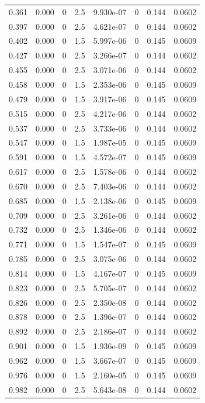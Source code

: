 \documentclass[preview]{standalone}
\begin{document}
{{\begin{tabular}{L{1.2cm}C{1.2cm} C{0.3cm}C{0.5cm} C{1.4cm}C{1.4cm} C{1.4cm}C{1.4cm}}
  0.361  &  0.000  & 0     & 2.5 &  9.930e-07  & 0  & 0.144 &  0.0602   \\ 
  0.397  &  0.000  & 0     & 2.5 &  4.621e-07  & 0  & 0.144 &  0.0602   \\ 
  0.402  &  0.000  & 0     & 1.5 &  5.997e-06  & 0  & 0.145 &  0.0609   \\ 
  0.427  &  0.000  & 0     & 2.5 &  3.266e-07  & 0  & 0.144 &  0.0602   \\ 
  0.455  &  0.000  & 0     & 2.5 &  3.071e-06  & 0  & 0.144 &  0.0602   \\ 
  0.458  &  0.000  & 0     & 1.5 &  2.353e-06  & 0  & 0.145 &  0.0609   \\ 
  0.479  &  0.000  & 0     & 1.5 &  3.917e-06  & 0  & 0.145 &  0.0609   \\ 
  0.515  &  0.000  & 0     & 2.5 &  4.217e-06  & 0  & 0.144 &  0.0602   \\ 
  0.537  &  0.000  & 0     & 2.5 &  3.733e-06  & 0  & 0.144 &  0.0602   \\ 
  0.547  &  0.000  & 0     & 1.5 &  1.987e-05  & 0  & 0.145 &  0.0609   \\ 
  0.591  &  0.000  & 0     & 1.5 &  4.572e-07  & 0  & 0.145 &  0.0609   \\ 
  0.617  &  0.000  & 0     & 2.5 &  1.578e-06  & 0  & 0.144 &  0.0602   \\ 
  0.670  &  0.000  & 0     & 2.5 &  7.403e-06  & 0  & 0.144 &  0.0602   \\ 
  0.685  &  0.000  & 0     & 1.5 &  2.138e-06  & 0  & 0.145 &  0.0609   \\ 
  0.709  &  0.000  & 0     & 2.5 &  3.261e-06  & 0  & 0.144 &  0.0602   \\ 
  0.732  &  0.000  & 0     & 2.5 &  1.346e-06  & 0  & 0.144 &  0.0602   \\ 
  0.771  &  0.000  & 0     & 1.5 &  1.547e-07  & 0  & 0.145 &  0.0609   \\ 
  0.785  &  0.000  & 0     & 2.5 &  3.075e-06  & 0  & 0.144 &  0.0602   \\ 
  0.814  &  0.000  & 0     & 1.5 &  4.167e-07  & 0  & 0.145 &  0.0609   \\ 
  0.823  &  0.000  & 0     & 2.5 &  5.705e-07  & 0  & 0.144 &  0.0602   \\ 
  0.826  &  0.000  & 0     & 2.5 &  2.350e-08  & 0  & 0.144 &  0.0602   \\ 
  0.878  &  0.000  & 0     & 2.5 &  1.396e-07  & 0  & 0.144 &  0.0602   \\ 
  0.892  &  0.000  & 0     & 2.5 &  2.186e-07  & 0  & 0.144 &  0.0602   \\ 
  0.901  &  0.000  & 0     & 1.5 &  1.936e-09  & 0  & 0.145 &  0.0609   \\ 
  0.962  &  0.000  & 0     & 1.5 &  3.667e-07  & 0  & 0.145 &  0.0609   \\ 
  0.976  &  0.000  & 0     & 1.5 &  2.160e-05  & 0  & 0.145 &  0.0609   \\ 
  0.982  &  0.000  & 0     & 2.5 &  5.643e-08  & 0  & 0.144 &  0.0602   \\ 
\hline 
\end{tabular} 

}}
\end{document}
